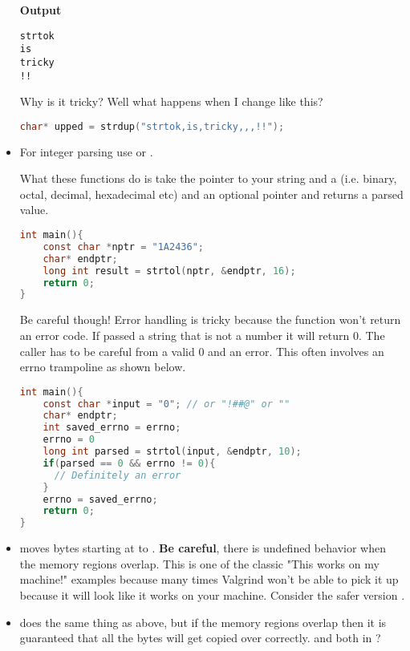 \begin{itemize}
	      \textbf{Output}

	      \begin{lstlisting}[language=console]
strtok
is
tricky
!!
\end{lstlisting}

	      Why is it tricky? Well what happens when I change  like this?

	      \begin{lstlisting}[language=C]
char* upped = strdup("strtok,is,tricky,,,!!");
\end{lstlisting}

	\item For integer parsing use
	      or
	      .

	      What these functions do is take the pointer to your string
	       and a  (i.e. binary, octal, decimal,
	      hexadecimal etc) and an optional pointer  and returns a
	      parsed value.

	      \begin{lstlisting}[language=C]
int main(){
    const char *nptr = "1A2436";
    char* endptr;
    long int result = strtol(nptr, &endptr, 16);
    return 0;
}
\end{lstlisting}

	      Be careful though!
        Error handling is tricky because the function won't return an error code.
        If passed a string that is not a number it will return 0.
        The caller has to be careful from a valid 0 and an error.
        This often involves an errno trampoline as shown below.

	      \begin{lstlisting}[language=C]
int main(){
    const char *input = "0"; // or "!##@" or ""
    char* endptr;
    int saved_errno = errno;
    errno = 0
    long int parsed = strtol(input, &endptr, 10);
    if(parsed == 0 && errno != 0){
      // Definitely an error
    }
    errno = saved_errno;
    return 0;
}
\end{lstlisting}

	    \item {} moves  bytes starting at  to .
        \textbf{Be careful}, there is undefined behavior when the memory regions overlap.
        This is one of the classic "This works on my machine!" examples because many times Valgrind won't be able to pick it up because it will look like it works on your machine.
        Consider the safer version .

	    \item {} does the same thing as above, but if the memory regions overlap then it is guaranteed that all the bytes will get copied over correctly.
         and  both in ?
\end{itemize}


